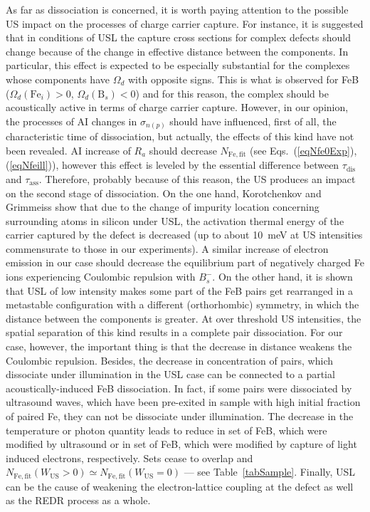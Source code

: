\documentclass[%
 aip,jap,
 amsmath,amssymb,
 reprint,%
]{revtex4-1}
\begin{document}
As far as dissociation is concerned, it is worth paying attention to the possible  US impact on the processes of charge carrier capture.
For instance,  it is suggested \cite{Olikh2018JAP} that in conditions of USL the capture cross sections for complex defects should change because of the change in effective distance between the components.
In particular, this effect is expected to be especially substantial for the complexes whose components have $\Omega_d$ with opposite signs.
This is what is observed for FeB ($\Omega_d(\mathrm{Fe}_i)>0$, $\Omega_d(\mathrm{B}_s)<0$)
and for this reason, the complex should be acoustically active in terms of charge carrier capture.
However, in our opinion, the processes of AI changes in $\sigma_{n(p)}$ should have influenced,
first of all, the characteristic time of dissociation,
but actually, the effects of this kind have not been revealed.
AI increase of $R_a$ should decrease $N_\mathrm{Fe,fit}$ (see Eqs.~(\ref{eqNfe0Exp}),(\ref{eqNfeill})),
however this effect is leveled by the essential difference between $\tau_\mathrm{dis}$
and $\tau_\mathrm{ass}$.
Therefore, probably because of this reason, the US produces an impact on the second stage of dissociation.
On the one hand, Korotchenkov and Grimmeiss show \cite{Korotchenkov1995} that due to the change of impurity location concerning surrounding atoms in silicon under USL,
the activation thermal energy of the carrier captured by the defect  is decreased
(up to about 10~meV at US intensities commensurate to those in our experiments).
A similar increase of electron emission in our case should decrease the equilibrium part of negatively charged Fe ions experiencing Coulombic repulsion with $B_s^-$.
On the other hand, it is shown \cite{OlikhPSS} that USL of low intensity makes some part of the FeB pairs get rearranged in a metastable configuration with a different (orthorhombic) symmetry,
in which the distance between the components is  greater.
At over threshold US intensities, the spatial separation of this kind results in a complete pair dissociation.\cite{Ostapenko1995,Ostapenko1995SST,Ostapenko1994APL}
For our case, however, the important thing is that the decrease in distance weakens the Coulombic repulsion.
Besides, the decrease in concentration of pairs, which dissociate under illumination in the USL case can be connected to a partial acoustically-induced FeB dissociation.
In fact, if some pairs were dissociated by  ultrasound waves, which have been pre-exited
in sample with high initial  fraction of paired Fe,
they can not be dissociate under illumination.
The decrease in the temperature  or photon quantity leads to reduce in set of FeB, which were modified by ultrasound or in set of FeB, which were modified by capture of light induced electrons, respectively.
Sets cease to overlap and $N_\mathrm{Fe,fit}(W_\mathrm{US}>0)\simeq N_\mathrm{Fe,fit}(W_\mathrm{US}=0)$ --- see Table~\ref{tabSample}.
Finally, USL can be the cause of weakening the electron-lattice coupling at the defect as well as the REDR process as a whole.
\end{document}
